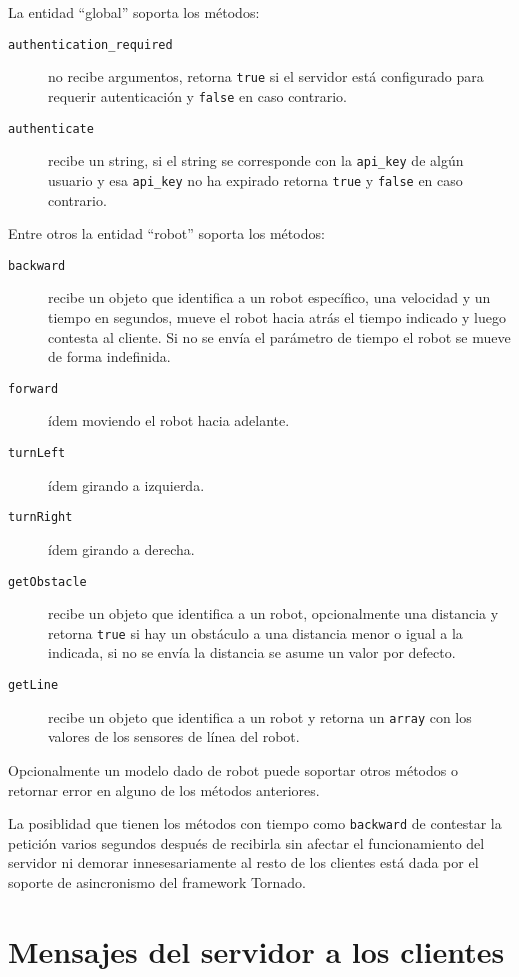 La entidad ``global'' soporta los métodos:
\begin{description}
    \item[\texttt{authentication\_required}] no recibe argumentos, retorna
        \texttt{true} si el servidor está configurado para requerir
        autenticación y \texttt{false} en caso contrario.
    \item[\texttt{authenticate}] recibe un string, si el string se corresponde
        con la \texttt{api\_key} de algún usuario y esa \texttt{api\_key} no
        ha expirado retorna \texttt{true} y \texttt{false} en caso contrario.
\end{description}

Entre otros la entidad ``robot'' soporta los métodos:
\begin{description}
    \item[\texttt{backward}] recibe un objeto que identifica a un robot
        específico, una velocidad y un tiempo en segundos,
        mueve el robot hacia atrás el tiempo indicado y luego contesta
        al cliente. Si no se envía el parámetro de tiempo el robot se mueve
        de forma indefinida.
    \item[\texttt{forward}] ídem moviendo el robot hacia adelante.
    \item[\texttt{turnLeft}] ídem girando a izquierda.
    \item[\texttt{turnRight}] ídem girando a derecha.
    \item[\texttt{getObstacle}] recibe un objeto que identifica a un robot,
        opcionalmente una distancia y retorna
        \texttt{true} si hay un obstáculo a una distancia menor o igual a la
        indicada, si no se envía la distancia se asume un valor por defecto.
    \item[\texttt{getLine}] recibe un objeto que identifica a un robot y
        retorna un \texttt{array}
        con los valores de los sensores de línea del robot.
\end{description}

Opcionalmente un modelo dado de robot puede soportar otros métodos o retornar
error en alguno de los métodos anteriores.

La posiblidad que tienen los métodos con tiempo como \texttt{backward} de
contestar la petición varios segundos después de recibirla sin afectar
el funcionamiento del servidor ni demorar innesesariamente al resto de los
clientes está dada por el soporte de asincronismo del framework Tornado.

\section{Mensajes del servidor a los clientes}

